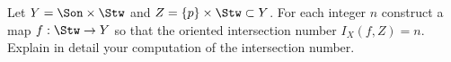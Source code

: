 Let $Y=\Son\times \Stw$ and $Z=\{p\}\times \Stw\subset Y$. For each
integer $n$ construct a map $f:\Stw\rightarrow Y$ so that the oriented
intersection number $I_X(f,Z)=n$. Explain in detail your computation
of the intersection number.
